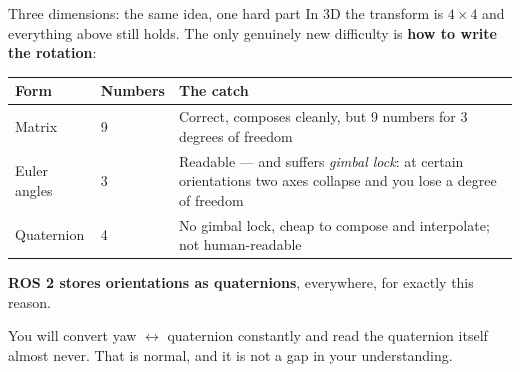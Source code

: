 \documentclass[aspectratio=169]{beamer}
\begin{document}
\begin{frame}{Three dimensions: the same idea, one hard part}
  \small
  In 3D the transform is $4\times4$ and everything above still holds. The only genuinely new
  difficulty is \textbf{how to write the rotation}:

  \vspace{0.5em}
  \begin{center}
  \begin{tabular}{@{}p{2.4cm}p{2.0cm}p{6.2cm}@{}}
    \toprule
    \textbf{Form} & \textbf{Numbers} & \textbf{The catch} \\
    \midrule
    Matrix & 9 & Correct, composes cleanly, but 9 numbers for 3 degrees of freedom \\[0.3em]
    Euler angles & 3 & Readable --- and suffers \emph{gimbal lock}: at certain orientations two
      axes collapse and you lose a degree of freedom \\[0.3em]
    Quaternion & 4 & No gimbal lock, cheap to compose and interpolate; not human-readable \\
    \bottomrule
  \end{tabular}
  \end{center}

  \vspace{0.6em}
  \textbf{ROS 2 stores orientations as quaternions}, everywhere, for exactly this reason.

  \vspace{0.3em}
  \footnotesize
  You will convert yaw $\leftrightarrow$ quaternion constantly and read the quaternion itself
  almost never. That is normal, and it is not a gap in your understanding.
\end{frame}
\end{document}
